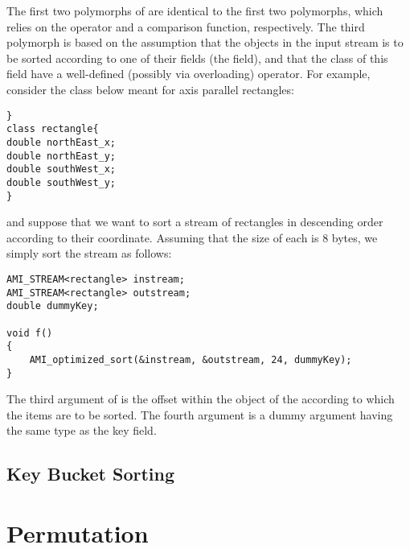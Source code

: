 The first two polymorphs of  are identical to
the first two  polymorphs, which relies on the \myverb{<}
operator and a comparison function, respectively. The third polymorph is based on the assumption that the objects in
the input stream is to be sorted according to one of their fields (the
 field), and that the class of this field have a well-defined
(possibly via overloading) \myverb{<} operator. For example, consider the
class  below meant for axis parallel rectangles:

\begin{verbatim}}
class rectangle{
double northEast_x;
double northEast_y;
double southWest_x;
double southWest_y;
}
\end{verbatim}

and suppose that we want to sort a stream of rectangles in descending order
according to their  coordinate. Assuming that the size
of each  is 8 bytes, we simply sort the stream as follows:
 
\begin{verbatim}
AMI_STREAM<rectangle> instream;
AMI_STREAM<rectangle> outstream;
double dummyKey;

void f()
{
    AMI_optimized_sort(&instream, &outstream, 24, dummyKey);
}
\end{verbatim}

The third argument of  is the offset within the
object of the  according to which the items are to be sorted. The
fourth argument is a dummy argument having the same type as the key
field.




\subsection{Key Bucket Sorting}
\label{sec:kb-sorting}


\tobewritten


\section{Permutation}

